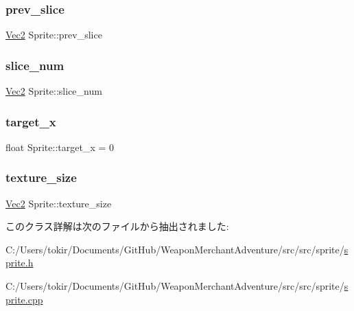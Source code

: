 \mbox{\label{class_sprite_a5c96c0e7d46a79740a5fe9e71e9f132b}} 
\subsubsection{\texorpdfstring{prev\+\_\+slice}{prev\_slice}}
{\footnotesize\ttfamily \mbox{\hyperlink{common_8h_ae148fff5818e9444b4ab2288829559bf}{Vec2}} Sprite\+::prev\+\_\+slice}

\mbox{\label{class_sprite_aac62c18a9b678d357f3465d45b2e6ebd}} 
\subsubsection{\texorpdfstring{slice\+\_\+num}{slice\_num}}
{\footnotesize\ttfamily \mbox{\hyperlink{common_8h_ae148fff5818e9444b4ab2288829559bf}{Vec2}} Sprite\+::slice\+\_\+num}

\mbox{\label{class_sprite_add18808500d3dca23d496757bf10259a}} 
\subsubsection{\texorpdfstring{target\+\_\+x}{target\_x}}
{\footnotesize\ttfamily float Sprite\+::target\+\_\+x = 0\hspace{0.3cm}{\ttfamily [static]}}

\mbox{\label{class_sprite_afb8f3dc3f60aaa09306153d50e4243c9}} 
\subsubsection{\texorpdfstring{texture\+\_\+size}{texture\_size}}
{\footnotesize\ttfamily \mbox{\hyperlink{common_8h_ae148fff5818e9444b4ab2288829559bf}{Vec2}} Sprite\+::texture\+\_\+size}



このクラス詳解は次のファイルから抽出されました\+:\begin{DoxyCompactItemize}
\item 
C\+:/\+Users/tokir/\+Documents/\+Git\+Hub/\+Weapon\+Merchant\+Adventure/src/src/sprite/\mbox{\hyperlink{sprite_8h}{sprite.\+h}}\item 
C\+:/\+Users/tokir/\+Documents/\+Git\+Hub/\+Weapon\+Merchant\+Adventure/src/src/sprite/\mbox{\hyperlink{sprite_8cpp}{sprite.\+cpp}}\end{DoxyCompactItemize}
